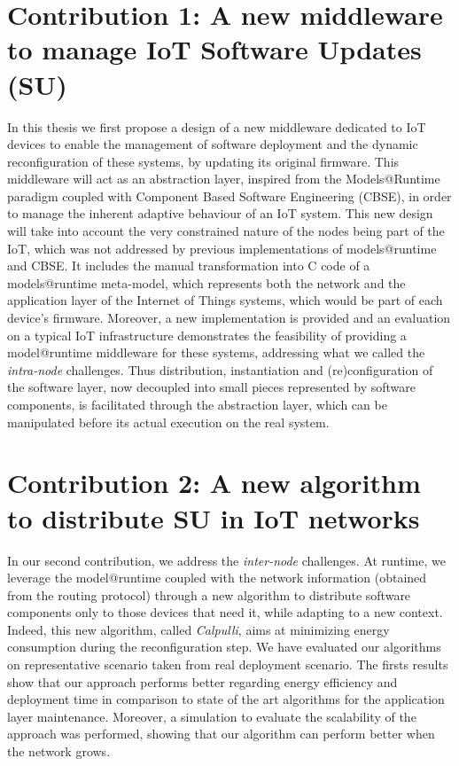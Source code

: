 \section*{Contribution 1: A new middleware to manage IoT Software Updates (SU)}
In this thesis we first propose a design of a new middleware dedicated to IoT devices to enable the management of software deployment and the dynamic reconfiguration of these systems, by updating its original firmware.
This middleware will act as an abstraction layer, inspired from the Models@Runtime paradigm coupled with Component Based Software Engineering (CBSE), in order to manage the inherent adaptive behaviour of an IoT system.
This new design will take into account the very constrained nature of the nodes being part of the IoT, which was not addressed by previous implementations of models@runtime and CBSE.
It includes the manual transformation into C code of a models@runtime meta-model, which represents both the network and the application layer of the Internet of Things systems, which would be part of each device's firmware.
Moreover, a new implementation is provided and an evaluation on a typical IoT infrastructure demonstrates the feasibility of providing a model@runtime middleware for these systems, addressing what we called the \textit{intra-node} challenges.
Thus distribution, instantiation and (re)configuration of the software layer, now decoupled into small pieces represented by software components, is facilitated through the abstraction layer, which can be manipulated before its actual execution on the real system.
 
\section*{Contribution 2: A new algorithm to distribute SU in IoT networks}
In our second contribution, we address the \textit{inter-node} challenges.
At runtime, we leverage the model@runtime coupled with the network information (obtained from the routing protocol) through a new algorithm to distribute software components only to those devices that need it, while adapting to a new context.
Indeed, this new algorithm, called \textit{Calpulli}, aims at minimizing energy consumption during the reconfiguration step.
We have evaluated our algorithms on representative scenario taken from real deployment scenario.
The firsts results show that our approach performs better regarding energy efficiency and deployment time in comparison to state of the art algorithms for the application layer maintenance.
Moreover, a simulation to evaluate the scalability of the approach was performed, showing that our algorithm can perform better when the network grows.